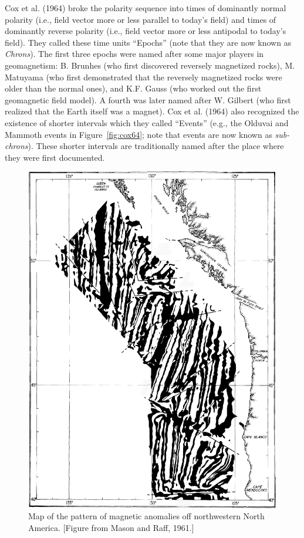 Cox et al. (1964) broke the  polarity sequence   into times of
dominantly normal polarity (i.e., field vector more or less parallel to today's field) and times of dominantly reverse polarity (i.e., field vector more or less antipodal to today's field).
They  called these  time units ``Epochs''  (note that  they are now known as 
{\it Chrons}).  
The first three epochs were named after some major players in geomagnetism:  B. Brunhes (who first discovered reversely magnetized rocks), 
M. Matuyama (who first demonstrated that  the reversely magnetized rocks were older than the normal ones),  and 
K.F. Gauss (who worked out the first geomagnetic field model).  A fourth was later named after  
W. Gilbert (who first realized that the Earth itself was a magnet).   
 Cox et al. (1964) also recognized the existence of shorter intervals which they called ``Events'' (e.g., the Olduvai and Mammoth events in Figure~\ref{fig:cox64}; note that events are now known as
 {\it sub-chrons}).   These shorter intervals are traditionally named after the place where they were first documented.  

\begin{figure}[h!tb]
\centering  \includegraphics[width=10 cm]{EPSfiles/mason61.eps}
\caption{Map of the pattern of magnetic anomalies off northwestern North America.  [Figure from Mason and Raff, 1961.]}
\label{fig:mason61}
\end{figure}

